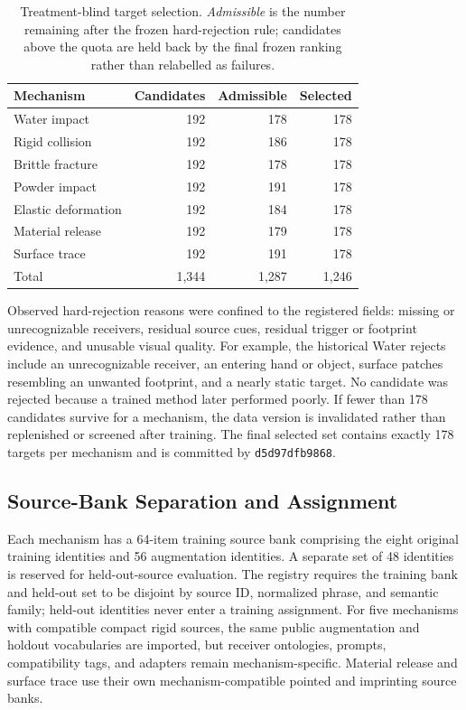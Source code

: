\begin{table}[t]
  \centering
  \caption{Treatment-blind target selection. \emph{Admissible} is the number
  remaining after the frozen hard-rejection rule; candidates above the quota
  are held back by the final frozen ranking rather than relabelled as failures.}
  \label{tab:target-screen-counts}
  \small
  \begin{tabular}{lrrr}
    \toprule
    Mechanism & Candidates & Admissible & Selected \\
    \midrule
    Water impact        & 192 & 178 & 178 \\
    Rigid collision     & 192 & 186 & 178 \\
    Brittle fracture    & 192 & 178 & 178 \\
    Powder impact       & 192 & 191 & 178 \\
    Elastic deformation & 192 & 184 & 178 \\
    Material release    & 192 & 179 & 178 \\
    Surface trace       & 192 & 191 & 178 \\
    \midrule
    Total               & 1,344 & 1,287 & 1,246 \\
    \bottomrule
  \end{tabular}
\end{table}

Observed hard-rejection reasons were confined to the registered fields:
missing or unrecognizable receivers, residual source cues, residual trigger or
footprint evidence, and unusable visual quality.  For example, the historical
Water rejects include an unrecognizable receiver, an entering hand or object,
surface patches resembling an unwanted footprint, and a nearly static target.
No candidate was rejected because a trained method later performed poorly.
If fewer than 178 candidates survive for a mechanism, the data version is
invalidated rather than replenished or screened after training.  The final
selected set contains exactly 178 targets per mechanism and is committed by
\texttt{d5d97dfb9868}.

\subsection{Source-Bank Separation and Assignment}
\label{app:source-bank}

Each mechanism has a 64-item training source bank comprising the eight
original training identities and 56 augmentation identities.  A separate set
of 48 identities is reserved for held-out-source evaluation.  The registry
requires the training bank and held-out set to be disjoint by source ID,
normalized phrase, and semantic family; held-out identities never enter a
training assignment.  For five mechanisms with compatible compact rigid
sources, the same public augmentation and holdout vocabularies are imported,
but receiver ontologies, prompts, compatibility tags, and adapters remain
mechanism-specific.  Material release and surface trace use their own
mechanism-compatible pointed and imprinting source banks.

